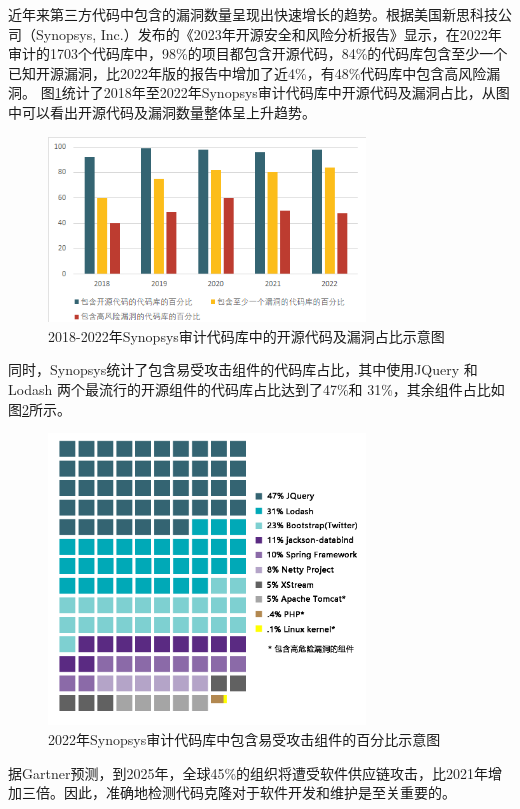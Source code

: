 近年来第三方代码中包含的漏洞数量呈现出快速增长的趋势。根据美国新思科技公司（Synopsys, Inc.）发布的《2023年开源安全和风险分析报告》\cite{Synopsys_2023}显示，在2022年审计的1703个代码库中，98\%的项目都包含开源代码，84\%的代码库包含至少一个已知开源漏洞，比2022年版的报告中增加了近4\%，有48\%代码库中包含高风险漏洞。
图\ref{fig:Proportion}统计了2018年至2022年Synopsys审计代码库中开源代码及漏洞占比，从图中可以看出开源代码及漏洞数量整体呈上升趋势。
\begin{figure}
 \centering
 \includegraphics[width=0.75\textwidth]{figures/Proportion}
 \caption{2018-2022年Synopsys审计代码库中的开源代码及漏洞占比示意图}
 \label{fig:Proportion}
\end{figure}
同时，Synopsys统计了包含易受攻击组件的代码库占比，其中使用JQuery 和 Lodash 两个最流行的开源组件的代码库占比达到了47\%和 31\%，其余组件占比如图\ref{fig:assembly}所示。
\begin{figure}
    \centering
    \includegraphics[width=0.75\textwidth]{figures/assembly}
    \caption{2022年Synopsys审计代码库中包含易受攻击组件的百分比示意图}\label{fig:assembly}
\end{figure}
据Gartner\cite{Gartner_2022}预测，到2025年，全球45\%的组织将遭受软件供应链攻击，比2021年增加三倍。因此，准确地检测代码克隆对于软件开发和维护是至关重要的。

